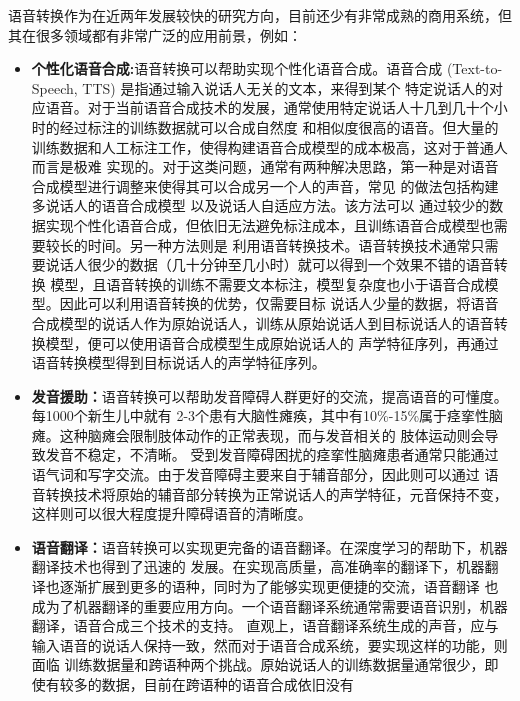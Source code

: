 语音转换作为在近两年发展较快的研究方向，目前还少有非常成熟的商用系统，但其在很多领域都有非常广泛的应用前景，例如：
\begin{itemize}
    \item \textbf{个性化语音合成:}语音转换可以帮助实现个性化语音合成。语音合成 (Text-to-Speech, TTS) 是指通过输入说话人无关的文本，来得到某个
    特定说话人的对应语音。对于当前语音合成技术的发展，通常使用特定说话人十几到几十个小时的经过标注的训练数据就可以合成自然度
    和相似度很高的语音。但大量的训练数据和人工标注工作，使得构建语音合成模型的成本极高，这对于普通人而言是极难
    实现的。对于这类问题，通常有两种解决思路，第一种是对语音合成模型进行调整来使得其可以合成另一个人的声音，常见
    的做法包括构建多说话人的语音合成模型\cite{gibiansky2017deep,ping2017deep,fan2015multi}
    以及说话人自适应方法\cite{tamura2001adaptation,wu2015study,yamagishi2009analysis}。该方法可以
    通过较少的数据实现个性化语音合成，但依旧无法避免标注成本，且训练语音合成模型也需要较长的时间。另一种方法则是
    利用语音转换技术\cite{kain1998spectral,arslan1999speaker}。语音转换技术通常只需要说话人很少的数据（几十分钟至几小时）就可以得到一个效果不错的语音转换
    模型，且语音转换的训练不需要文本标注，模型复杂度也小于语音合成模型。因此可以利用语音转换的优势，仅需要目标
    说话人少量的数据，将语音合成模型的说话人作为原始说话人，训练从原始说话人到目标说话人的语音转换模型，便可以使用语音合成模型生成原始说话人的
    声学特征序列，再通过语音转换模型得到目标说话人的声学特征序列。
    \item \textbf{发音援助：}语音转换可以帮助发音障碍人群更好的交流，提高语音的可懂度。每1000个新生儿中就有
    2-3个患有大脑性瘫痪，其中有10\%-15\%属于痉挛性脑瘫。这种脑瘫会限制肢体动作的正常表现，而与发音相关的
    肢体运动则会导致发音不稳定，不清晰\cite{hollegaard2013joint,aihara2013individuality}。
    受到发音障碍困扰的痉挛性脑瘫患者通常只能通过语气词和写字交流。由于发音障碍主要来自于辅音部分，因此则可以通过
    语音转换技术将原始的辅音部分转换为正常说话人的声学特征，元音保持不变，这样则可以很大程度提升障碍语音的清晰度。
    \item \textbf{语音翻译：}语音转换可以实现更完备的语音翻译。在深度学习的帮助下，机器翻译技术也得到了迅速的
    发展。在实现高质量，高准确率的翻译下，机器翻译也逐渐扩展到更多的语种，同时为了能够实现更便捷的交流，语音翻译
    也成为了机器翻译的重要应用方向。一个语音翻译系统通常需要语音识别，机器翻译，语音合成三个技术的支持。
    直观上，语音翻译系统生成的声音，应与输入语音的说话人保持一致，然而对于语音合成系统，要实现这样的功能，则面临
    训练数据量和跨语种两个挑战。原始说话人的训练数据量通常很少，即使有较多的数据，目前在跨语种的语音合成依旧没有

\end{itemize}
